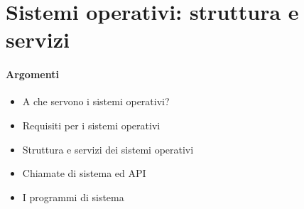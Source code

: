 \chapter{Sistemi operativi: struttura e servizi}
\subsubsection{Argomenti}
\begin{itemize}
    \item A che servono i sistemi operativi?
    \item Requisiti per i sistemi operativi
    \item Struttura e servizi dei sistemi operativi
    \item Chiamate di sistema ed API
    \item I programmi di sistema
\end{itemize}

